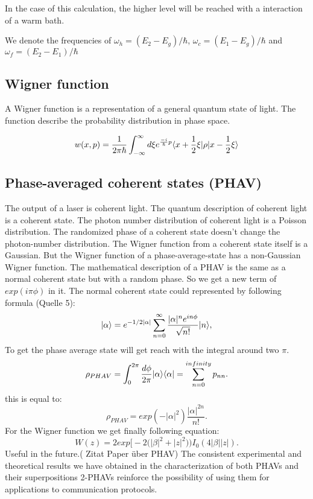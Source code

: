 \documentclass[12pt,a4paper]{article}
\DeclarePairedDelimiter\bra{\langle}{\rvert}
\DeclarePairedDelimiter\ket{\lvert}{\rangle}
\begin{document}
In the case of this calculation, the higher level will be reached with a interaction of a warm bath. 

We denote the frequencies of $\omega_h=(E_2-E_g)/\hbar$, $\omega_c=(E_1-E_g)/\hbar$ and $\omega_f=(E_2-E_1)/\hbar$



\subsection{Wigner function}
A Wigner function is a representation of a general quantum state of light.
The function describe the probability distribution in phase space.

\begin{equation}
w(x,p)=\frac{1}{2\pi \hbar}\int_{- \infty}^{\infty} d\xi e^{\frac{-i}{\hbar}p}\bra{x+\frac{1}{2}\xi}\rho\ket{x-\frac{1}{2}\xi}
\end{equation}

\newpage
\subsection{Phase-averaged coherent states (PHAV)}
The output of a laser is coherent light.
The quantum description of coherent light is a coherent state. The photon number distribution of coherent light is a Poisson distribution. The randomized phase of a coherent state doesn't change the photon-number distribution. 
The Wigner function from a coherent state itself is a Gaussian. But the Wigner function of a phase-average-state has a non-Gaussian Wigner function. 
The mathematical description of a  PHAV is the same as a normal coherent state but with a random phase. So we get a new term of $exp(i\pi\phi)$ in it. 
The normal coherent state could represented by following formula (Quelle 5):
\begin{equation}
\ket{\alpha}=e^{-1/2|\alpha|}\sum_{n=0}^{\infty}\frac{|\alpha|^n e^{in\phi}}{\sqrt{n!}} \ket{n},
\end{equation}
To get the phase average state will get reach with the integral around two $\pi$.
\begin{equation}
\rho_{PHAV}=\int_0 ^{2\pi}\frac{d\phi}{2\pi}\ket{\alpha}\bra{\alpha}=\sum_{n=0}^{infinity}p_{nn}.
\end{equation}
this is equal to:
\begin{equation}
\rho_{PHAV}= exp(-|\alpha|^2)\frac{|\alpha|^{2n}}{n!}.
\end{equation}
For the Wigner function we get finally following equation:
\begin{equation}
W(z)=2  exp\bigl[-2\bigl(|\beta|^2+|z|^2\bigr)\bigr) I_0 (4|\beta| |z|).
\end{equation}
Useful in the future.( Zitat Paper über PHAV) The consistent experimental and theoretical results we have obtained in the characterization of both PHAVs and their superpositions 2-PHAVs reinforce the
possibility of using them for applications to communication protocols. 
\end{document}
